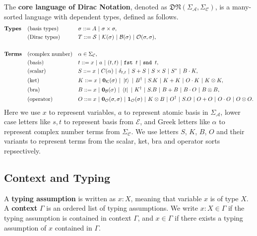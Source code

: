 \documentclass[manuscript, review, timestamp]{acmart}
\newcommand*{\Sc}{\mathcal{S}}
\newcommand*{\K}{\mathcal{K}}
\newcommand*{\B}{\mathcal{B}}
\newcommand*{\Op}{\mathcal{O}}
\newcommand*{\fst}{\texttt{fst }}
\newcommand*{\snd}{\texttt{snd }}
\begin{document}
\begin{definition}
  The \textbf{core language of Dirac Notation}, denoted as $\mathfrak{DN}(\Sigma_\mathcal{A}, \Sigma_\mathcal{C})$, is a many-sorted language with dependent types, defined as follows.
  \begin{align*}
    & \textbf{Types} && \textrm{(basis types)} && \sigma ::= A\ |\ \sigma \times \sigma, \\
    & && \textrm{(Dirac types)} && T ::= \Sc\ |\ \K(\sigma)\ |\ \B(\sigma)\ |\ \Op(\sigma, \sigma), \\
    \\
    & \textbf{Terms} && \textrm{(complex number)} && \alpha \in \Sigma_\mathcal{C}, \\
    & && \textrm{(basis)} && t ::= x\ |\ a\ |\ (t, t)\ |\ \fst t\ |\ \snd t, \\
    & && \textrm{(scalar)} && S ::= x\ |\ C(\alpha)\ |\ \delta_{t, t}\ |\ S + S\ |\ S \times S\ |\ S^*\ |\ B \cdot K, \\
    & && \textrm{(ket)} && K ::= x\ |\ \mathbf{0}_\mathcal{K}(\sigma)\ |\ \ket{t}\ |\ B^\dagger\ |\ S.K\ |\ K + K\ |\ O \cdot K\ |\ K \otimes K, \\
    & && \textrm{(bra)} && B ::= x\ |\ \mathbf{0}_\mathcal{B}(\sigma)\ |\ \bra{t}\ |\ K^\dagger\ |\ S.B\ |\ B + B\ |\ B \cdot O\ |\ B \otimes B, \\
    & && \textrm{(operator)} && O ::= x\ |\ \mathbf{0}_\mathcal{O}(\sigma, \sigma)\ |\ \mathbf{1}_\mathcal{O}(\sigma)\ |\ K \otimes B\ |\ O^\dagger\ |\ S.O\ |\ O + O\ |\ O \cdot O\ |\ O \otimes O.
  \end{align*}
  Here we use $x$ to represent variables, $a$ to represent atomic basis in $\Sigma_\mathcal{A}$, lower case letters like $s, t$ to represent basis from $\mathcal{E}$, and Greek letters like $\alpha$ to represent complex number terms from $\Sigma_\mathcal{C}$. We use letters $S$, $K$, $B$, $O$ and their variants to represent terms from the scalar, ket, bra and operator sorts repsectively.
\end{definition}

\subsection{Context and Typing}

\begin{definition}[context]
  A \textbf{typing assumption} is written as $x : X$, meaning that variable $x$ is of type $X$. A \textbf{context} $\Gamma$ is an ordered list of typing assumptions. We write $x : X \in \Gamma$ if the typing assumption is contained in context $\Gamma$, and $x \in \Gamma$ if there exists a typing assumption of $x$ contained in $\Gamma$.
\end{definition}
\end{document}
